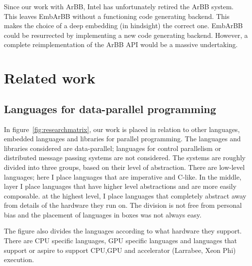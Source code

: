 \documentclass[a4paper]{book}
\begin{document}
Since our work with ArBB, Intel has unfortunately retired the ArBB system. This 
leaves EmbArBB without a functioning code generating backend. This makes the choice of a
deep embedding (in hindsight) the correct one. EmbArBB could be resurrected by implementing 
a new code generating backend. However, a complete reimplementation of the ArBB API would be 
a massive undertaking.


%
%
\section{Related work} 
\label{sec:relatedwork}
\FloatBarrier


\subsection{Languages for data-parallel programming}

In figure~\ref{fig:researchmatrix}, our work is placed in relation to other languages,
embedded languages and libraries for parallel programming. The languages and libraries considered 
are data-parallel; languages for control parallelism or distributed message passing systems are 
not considered. The systems are roughly divided 
into three groups, based on their level of abstraction. There are low-level languages; here 
I place languages that are imperative and C-like. In the middle, layer I place languages 
that have higher level abstractions and are more easily composable. 
at the highest level, I place languages that completely abstract away from details of the 
hardware they run on. The division is not free from personal bias and the placement of languages
in boxes was not always easy. 

The figure also divides the languages according to what hardware they support. There 
are CPU specific languages, GPU specific languages and languages that support or aspire 
to support CPU,GPU and accelerator (Larrabee, Xeon Phi) execution. 
\end{document}
